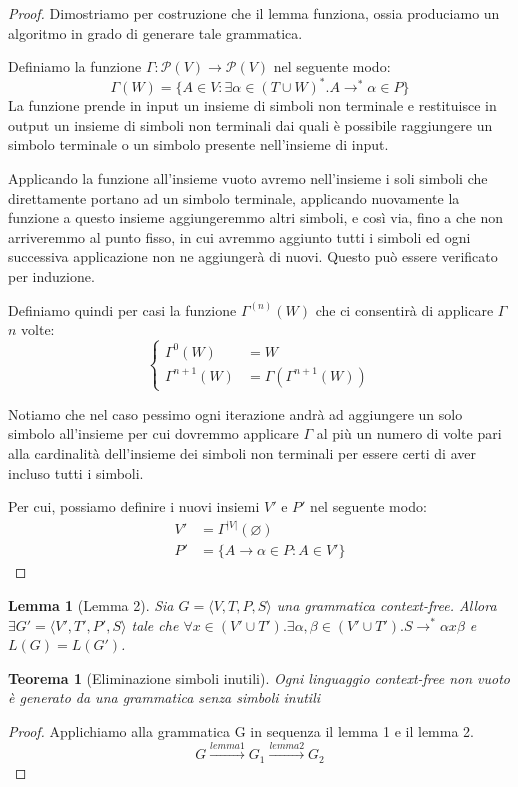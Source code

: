 \documentclass[a4paper,titlepage]{article}
\newtheorem{theorem}{Teorema}[section]
\newtheorem{lemma}{Lemma}[section]
\theoremstyle{definition}
\begin{document}
\begin{proof}
	Dimostriamo per costruzione che il lemma funziona, ossia produciamo un algoritmo in grado di generare tale grammatica. 
	
	Definiamo la funzione $\Gamma:\mathcal P(V)\to\mathcal P(V)$ nel seguente modo: 
	\[
		\Gamma(W) = \{A\in V:\exists\alpha\in(T\cup W)^*.A\rightarrow^*\alpha\in P\}
	\]
	La funzione prende in input un insieme di simboli non terminale e restituisce in output un insieme di simboli non terminali dai quali è possibile raggiungere un simbolo terminale o un simbolo presente nell'insieme di input. 
	
	Applicando la funzione all'insieme vuoto avremo nell'insieme i soli simboli che direttamente portano ad un simbolo terminale, applicando nuovamente la funzione a questo insieme aggiungeremmo altri simboli, e così via, fino a che non arriveremmo al punto fisso, in cui avremmo aggiunto tutti i simboli ed ogni successiva applicazione non ne aggiungerà di nuovi. Questo può essere verificato per induzione. 
	
	Definiamo quindi per casi la funzione $\Gamma^{(n)}(W)$ che ci consentirà di applicare $\Gamma$ $n$ volte:
	\[
		\begin{cases}
			\Gamma^0(W)&= W \\
			\Gamma^{n+1}(W)&=\Gamma(\Gamma^{n+1}(W))
		\end{cases}
	\]
	
	Notiamo che nel caso pessimo ogni iterazione andrà ad aggiungere un solo simbolo all'insieme per cui dovremmo applicare $\Gamma$ al più un numero di volte pari alla cardinalità dell'insieme dei simboli non terminali per essere certi di aver incluso tutti i simboli.
	
	Per cui, possiamo definire i nuovi insiemi $V'$ e $P'$ nel seguente modo:
	\[
		\begin{aligned}
			V'&=\Gamma^{|V|}(\varnothing)\\
			P'&=\{A\to\alpha\in P: A\in V' \}
		\end{aligned}
	\]
\end{proof} 

\begin{lemma}[Lemma 2]
	Sia $G=\langle V,T,P,S\rangle$ una grammatica context-free. Allora $\exists G' =\langle V',T',P',S\rangle$ tale che $\forall x\in (V'\cup T').\exists \alpha,\beta\in (V'\cup T').S\rightarrow^*\alpha x\beta$ e $L(G)=L(G')$. 
\end{lemma}

\begin{theorem}[Eliminazione simboli inutili]
	Ogni linguaggio context-free non vuoto è generato da una grammatica senza simboli inutili
\end{theorem}
\begin{proof}
	Applichiamo alla grammatica G in sequenza il lemma 1 e il lemma 2. 
	\[
		G\xrightarrow{lemma 1}G_1\xrightarrow{lemma 2}G_2
	\]
\end{proof}
\end{document}
